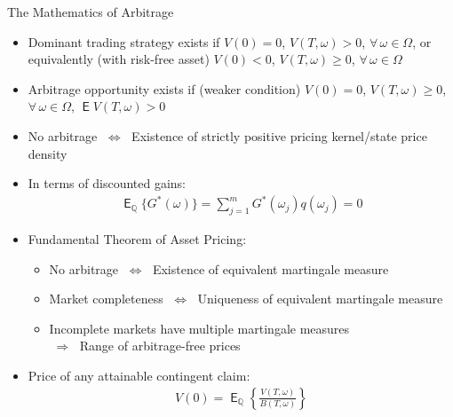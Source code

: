 \documentclass[10pt]{beamer}
\DeclareMathOperator\expc{\mathsf{E}}
\newcommand{\ie}{\;\Longrightarrow\;}
\newcommand{\ifff}{\;\Longleftrightarrow\;}
\begin{document}
\begin{frame}{The Mathematics of Arbitrage}
  \begin{itemize}[<+->]
    \item Dominant trading strategy exists if $V(0) = 0$, $V(T,\omega) > 0$, $\forall\,\omega\in\Omega$, or equivalently (with risk-free asset) $V(0) < 0$, $V(T,\omega)\geqslant 0$, $\forall\,\omega\in\Omega$
      
    \item Arbitrage opportunity exists if (weaker condition) $V(0) = 0$, $V(T,\omega)\geqslant 0$, $\forall\,\omega\in\Omega$, $\expc{V(T,\omega)} > 0$
      
    \item No arbitrage $\ifff$ Existence of strictly positive pricing kernel/state price density
    
    \item In terms of discounted gains:
      \begin{align*}
        \expc_{\mathbb{Q}}\{G^*(\omega)\} = \sum_{j=1}^m G^*(\omega_j)q(\omega_j) = 0
      \end{align*}
      
    \item Fundamental Theorem of Asset Pricing:
      \begin{itemize}
        \item No arbitrage $\ifff$ Existence of equivalent martingale measure
        \item Market completeness $\ifff$ Uniqueness of equivalent martingale measure
        \item Incomplete markets have multiple martingale measures \\$\ie$ Range of arbitrage-free prices
      \end{itemize}
      
    \item Price of any attainable contingent claim:
      \begin{align*}
        V(0) = \expc_{\mathbb{Q}}\left\{\tfrac{V(T,\omega)}{B(T,\omega)}\right\}
      \end{align*}
  \end{itemize}
\end{frame}

%  
%  
\end{document}
